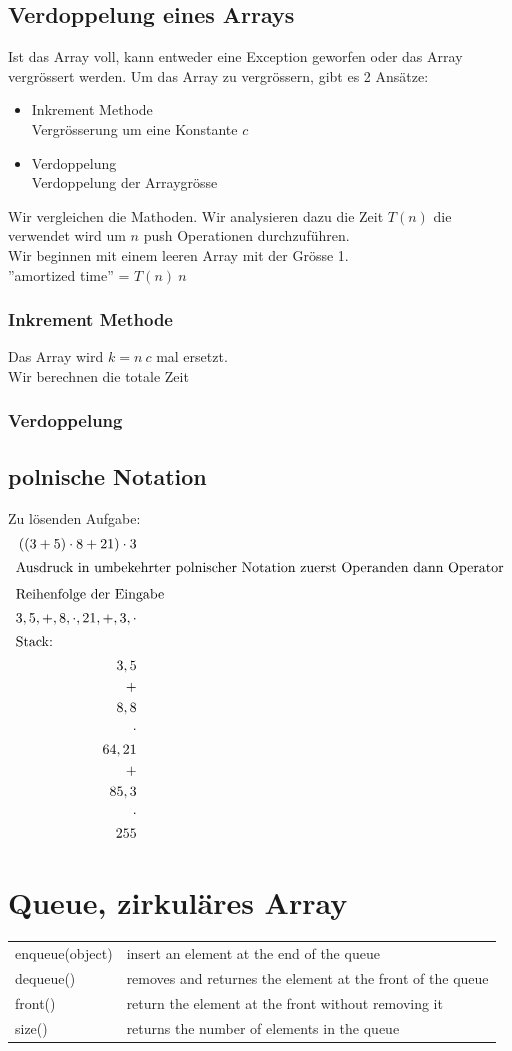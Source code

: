\documentclass[a4paper,10pt]{report}
\begin{document}
 \subsection{Verdoppelung eines Arrays}
 Ist das Array voll, kann entweder eine Exception geworfen oder das Array vergrössert werden. Um das Array zu vergrössern, gibt es 2 Ansätze:
 \begin{itemize}
 	\item{Inkrement Methode}\\
 	Vergrösserung um eine Konstante $c$
 	\item{Verdoppelung}\\
 	Verdoppelung der Arraygrösse
 \end{itemize}
 Wir vergleichen die Mathoden.
Wir analysieren dazu die Zeit $T(n)$ die verwendet wird um $n$ push Operationen durchzuführen.\\
 Wir beginnen mit einem leeren Array mit der Grösse 1.\\
''amortized time'' = $T(n)\ n$
 \subsubsection{Inkrement Methode}
 Das Array wird $k = n\ c$ mal ersetzt.\\
 Wir berechnen die totale Zeit
 \subsubsection{Verdoppelung}
 \subsection{polnische Notation}
 Zu lösenden Aufgabe:
 \begin{eqnarray*}
 	((3+5)\cdot 8 + 21)\cdot 3\\
 	\shortintertext{Ausdruck in umbekehrter polnischer Notation zuerst Operanden dann Operator}
 	\shortintertext{Reihenfolge der Eingabe}
 	3,5,+,8,\cdot,21,+,3,\cdot\\
 	\shortintertext{Stack:}
 	3,5\\
 	+ \\
 	8,8\\
 	\cdot\\
 	64,21\\
 	+\\
 	85,3\\
 	\cdot\\
 	255
 \end{eqnarray*}
 \section{Queue, zirkuläres Array}
  \begin{tabularx}{\textwidth}{lX}
 	enqueue(object) & insert an element at the end of the queue\\
 	dequeue() & removes and returnes the element at the front of the queue\\
 	front() & return the element at the front without removing it\\
 	size() & returns the number of elements in the queue
 \end{tabularx}
\end{document}
